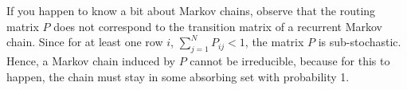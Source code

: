 \begin{remark}
  If you happen to know a bit about Markov chains, observe that the routing matrix $P$ does not correspond to the transition matrix of a recurrent Markov chain.
  Since for at least one row $i$, $\sum_{j=1}^N P_{i j}<1$, the matrix $P$ is sub-stochastic.
  Hence, a Markov chain induced by $P$ cannot be irreducible, because for this to happen, the chain must stay in some absorbing set with probability 1.
\end{remark}




